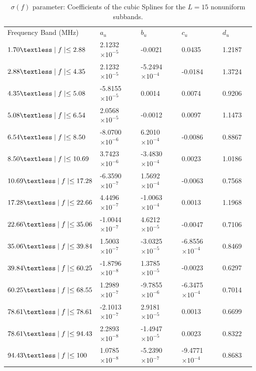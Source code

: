 \documentclass[journal]{IEEEtran}
\begin{document}
\begin{table}[h]
	\setlength\extrarowheight{4.5pt}
	\centering
	\caption{$\sigma(f)$ parameter: Coefficients of the cubic Splines for the $L=15$ nonuniform subbands.}
	\label{table_betasW}
	\begin{tabular}{|C{4cm}|C{3cm}|C{3cm}|C{3cm}|C{3cm}|m{0cm}}
		Frequency Band (MHz)           		   & $a_u$    			   	   & $b_u$      			  & $c_u$   		 		 & $d_u$ &\\ 
		$1.70\textless \mid f\mid \leq 2.88$   & 2.1232 $\times 10^{-5}$   & -0.0021 				  & 0.0435	 				 & 1.2187 &\\ 
		$2.88\textless \mid f\mid \leq 4.35$   & 2.1232 $\times 10^{-5}$   & -5.2494 $\times 10^{-4}$ & -0.0184  				 & 1.3724 &\\ 
		$4.35\textless \mid f\mid \leq 5.08$   & -5.8155 $\times 10^{-5}$  & 0.0014 				  & 0.0074 					 & 0.9206 &\\ 
		$5.08\textless \mid f\mid \leq 6.54$   & 2.0568 $\times 10^{-5}$   & -0.0012 				  & 0.0097	 				 & 1.1473 &\\ 
		$6.54\textless \mid f\mid \leq 8.50$   & -8.0700 $\times 10^{-6}$  & 6.2010 $\times 10^{-4}$  & -0.0086 				 & 0.8867 &\\ 
		$8.50\textless \mid f\mid \leq 10.69$  & 3.7423 $\times 10^{-6}$   & -3.4830 $\times 10^{-4}$ & 0.0023	 				 & 1.0186 &\\ 
		$10.69\textless \mid f\mid \leq 17.28$ & -6.3590 $\times 10^{-7}$  & 1.5692 $\times 10^{-4}$  & -0.0063  				 & 0.7568 &\\ 
		$17.28\textless \mid f\mid \leq 22.66$ & 4.4496 $\times 10^{-7}$   & -1.0063 $\times 10^{-4}$ & 0.0013 					 & 1.1968 &\\ 
		$22.66\textless \mid f\mid \leq 35.06$ & -1.0044  $\times 10^{-7}$ & 4.6212 $\times 10^{-5}$  & -0.0047					 & 0.7106 &\\ 
		$35.06\textless \mid f\mid \leq 39.84$ & 1.5003  $\times 10^{-7}$  & -3.0325 $\times 10^{-5}$ & -6.8556 $\times 10^{-4}$ & 0.8469 &\\ 
		$39.84\textless \mid f\mid \leq 60.25$ & -1.8796 $\times 10^{-8}$  & 1.3785  $\times 10^{-5}$ & -0.0023  				 & 0.6297 &\\ 
		$60.25\textless \mid f\mid \leq 68.55$ & 1.2989   $\times 10^{-7}$ & -9.7855 $\times 10^{-6}$ & -6.3475	$\times 10^{-4}$ & 0.7014 &\\ 
		$78.61\textless \mid f\mid \leq 78.61$ & -2.1013 $\times 10^{-7}$  & 2.9181  $\times 10^{-5}$ & 0.0013					 & 0.6699 &\\ 
		$78.61\textless \mid f\mid \leq 94.43$ & 2.2893  $\times 10^{-8}$  & -1.4947 $\times 10^{-5}$ & 0.0023				     & 0.8322 &\\ 
		$94.43\textless \mid f\mid \leq 100$   & 1.0785  $\times 10^{-8}$  & -5.2390 $\times 10^{-7}$ & -9.4771 $\times 10^{-4}$ & 0.8683 &\\ 
	\end{tabular}
\end{table}
\end{document}

